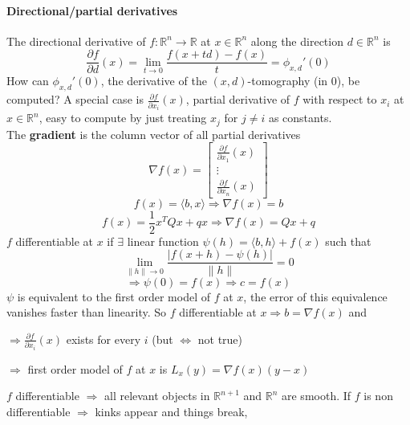 \documentclass[10pt]{report}
\begin{document}
\paragraph{Directional/partial derivatives} The directional derivative of $f:\mathbb{R}^n\rightarrow \mathbb{R}$ at $x\in \mathbb{R}^n$ along the direction $d\in \mathbb{R}^n$ is $$\frac{\partial f}{\partial d}(x) = \lim_{t\to 0}\frac{f(x+td) - f(x)}{t} = \phi_{x,d}'(0)$$
How can $\phi_{x,d}'(0)$, the derivative of the $(x,d)$-tomography (in 0), be computed? A special case is $\frac{\partial f}{\partial x_i}(x)$, partial derivative of $f$ with respect to $x_i$ at $x\in \mathbb{R}^n$, easy to compute by just treating $x_j$ for $j\neq i$ as constants.\\
The \textbf{gradient} is the column vector of all partial derivatives $$\nabla f(x) = \left[\begin{array}{c}
\frac{\partial f}{\partial x_1}(x)\\
\vdots\\
\frac{\partial f}{\partial x_n}(x)
\end{array}\right]$$
$$f(x) = \langle b,x\rangle \Rightarrow\nabla f(x) = b$$
$$f(x) = \frac{1}{2}x^TQx + qx \Rightarrow\nabla f(x) = Qx + q$$
$f$ differentiable at $x$ if $\exists$ linear function $\psi(h) =\langle b,h\rangle + f(x)$ such that $$\lim_{\|h\|\to 0}\frac{|f(x+h) - \psi(h)|}{\|h\|} = 0$$ $$\Rightarrow \psi(0) = f(x) \Rightarrow c = f(x)$$
$\psi$ is equivalent to the first order model of $f$ at $x$, the error of this equivalence vanishes faster than linearity. So $f$ differentiable at $x\Rightarrow b = \nabla f(x)$ and\begin{list}{}{}
	\item $\Rightarrow \frac{\partial f}{\partial x_i}(x)$ exists for every $i$ (but $\Leftrightarrow$ not true)
	\item $\Rightarrow$ first order model of $f$ at $x$ is $L_x(y) = \nabla f(x)(y-x)$
\end{list}
$f$ differentiable $\Rightarrow$ all relevant objects in $\mathbb{R}^{n+1}$ and $\mathbb{R}^n$ are smooth. If $f$ is non differentiable $\Rightarrow$ kinks appear and things break,
\end{document}
